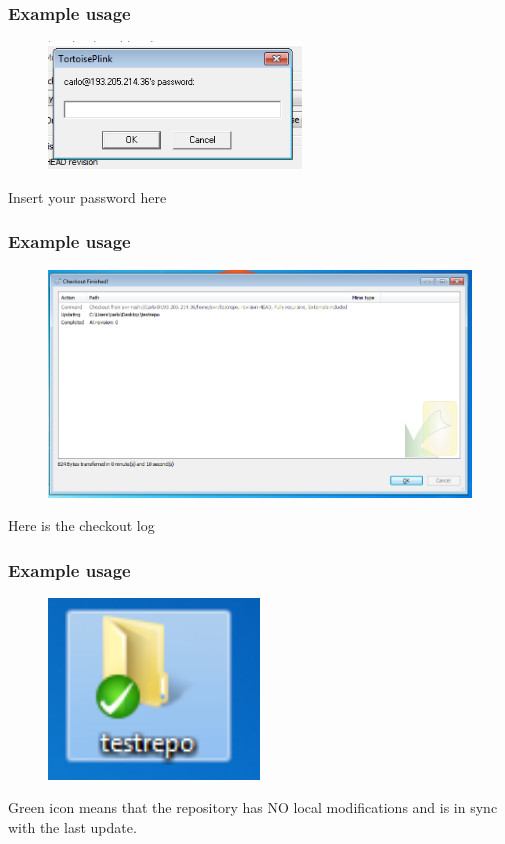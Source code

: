 \documentclass[10pt]{beamer}
\begin{document}
\begin{frame}[fragile]
\frametitle{Example usage}
\begin{figure}[h]
 \centering
 \includegraphics[width=0.6\textwidth]{images/image3.png}
\end{figure}
Insert your password here
\end{frame}

\begin{frame}[fragile]
\frametitle{Example usage}
\begin{figure}[h]
 \centering
 \includegraphics[width=1.0\textwidth]{images/image4.png}
\end{figure}
Here is the checkout log
\end{frame}

\begin{frame}[fragile]
\frametitle{Example usage}
\begin{figure}[h]
 \centering
 \includegraphics[width=0.5\textwidth]{images/image5.png}
\end{figure}
Green icon means that the repository has NO local modifications and is in sync with the last update.
\end{frame}
\end{document}
